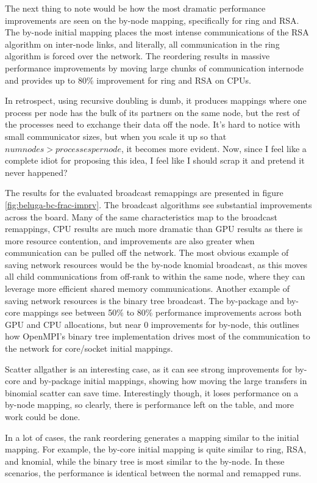 The next thing to note would be how the most dramatic performance improvements are seen on the by-node mapping, specifically for ring and RSA. 
The by-node initial mapping places the most intense communications of the RSA algorithm on inter-node links, and literally, all communication in the ring algorithm is forced over the network.
The reordering results in massive performance improvements by moving large chunks of communication internode and provides up to 80\% improvement for ring and RSA on CPUs.

In retrospect, using recursive doubling is dumb, it produces mappings where one process per node has the bulk of its partners on the same node, but the rest of the processes need to exchange their data off the node. 
It's hard to notice with small communicator sizes, but when you scale it up so that $numnodes > processes per node$, it becomes more evident.
Now, since I feel like a complete idiot for proposing this idea, I feel like I should scrap it and pretend it never happened?

The results for the evaluated broadcast remappings are presented in figure \ref{fig:beluga-bc-frac-imprv}.
The broadcast algorithms see substantial improvements across the board. 
Many of the same characteristics map to the broadcast remappings, CPU results are much more dramatic than GPU results as there is more resource contention, and improvements are also greater when communication can be pulled off the network. 
The most obvious example of saving network resources would be the by-node knomial broadcast, as this moves all child communications from off-rank to within the same node, where they can leverage more efficient shared memory communications. 
Another example of saving network resources is the binary tree broadcast.
The by-package and by-core mappings see between 50\% to 80\% performance improvements across both GPU and CPU allocations, but near 0 improvements for by-node, this outlines how OpenMPI's binary tree implementation drives most of the communication to the network for core/socket initial mappings. 

Scatter allgather is an interesting case, as it can see strong improvements for by-core and by-package initial mappings, showing how moving the large transfers in binomial scatter can save time. 
Interestingly though, it loses performance on a by-node mapping, so clearly, there is performance left on the table, and more work could be done.

In a lot of cases, the rank reordering generates a mapping similar to the initial mapping.
For example, the by-core initial mapping is quite similar to ring, RSA, and knomial, while the binary tree is most similar to the by-node.
In these scenarios, the performance is identical between the normal and remapped runs.

